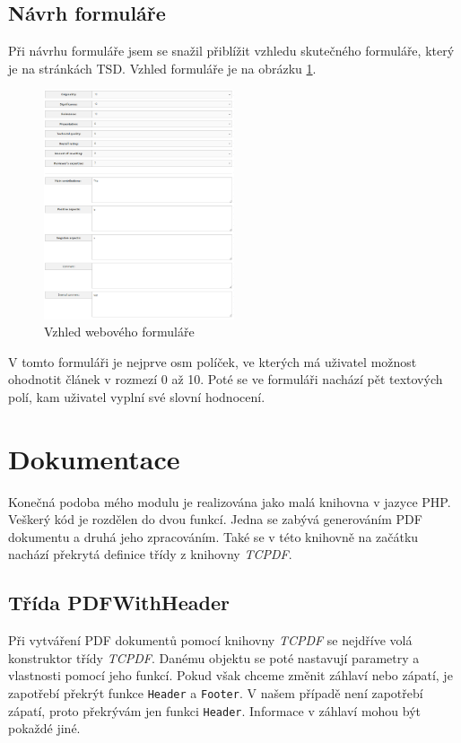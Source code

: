 \documentclass[czech,BP]{thesiskiv}
\begin{document}
\section{Návrh formuláře}
Při návrhu formuláře jsem se snažil přiblížit vzhledu skutečného formuláře, který je na stránkách TSD. Vzhled formuláře je na obrázku \ref{webform}.
\begin{figure}[h]
    \centering
    	\includegraphics[width=0.5\textwidth]{obr8.png}
    	\caption{Vzhled webového formuláře}
    	\label{webform}
\end{figure}
V tomto formuláři je nejprve osm políček, ve kterých má uživatel možnost ohodnotit článek v rozmezí 0 až 10. Poté se ve formuláři nachází pět textových polí, kam uživatel vyplní své slovní hodnocení. 


\chapter{Dokumentace}
Konečná podoba mého modulu je realizována jako malá knihovna v jazyce PHP. Veškerý kód je rozdělen do dvou funkcí. Jedna se zabývá generováním PDF dokumentu a druhá jeho zpracováním. Také se v této knihovně na začátku nachází překrytá definice třídy z knihovny \emph{TCPDF}. 
\section{Třída PDFWithHeader}
Při vytváření PDF dokumentů pomocí knihovny \emph{TCPDF} se nejdříve volá konstruktor třídy \emph{TCPDF}. Danému objektu se poté nastavují parametry a vlastnosti pomocí jeho funkcí. Pokud však chceme změnit záhlaví nebo zápatí, je zapotřebí překrýt funkce \texttt{Header} a \texttt{Footer}. V našem případě není zapotřebí zápatí, proto překrývám jen funkci \texttt{Header}. Informace v záhlaví mohou být pokaždé jiné. 
\end{document}
